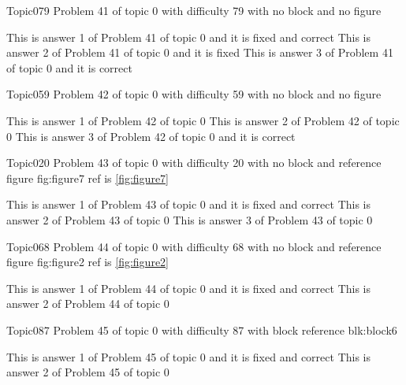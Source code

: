 \documentclass[master]{exam}
\begin{document}
\begin{problem}{Topic0}{79}
	Problem 41 of topic 0 with difficulty 79 with no block and no figure
	\begin{answers}
		 This is answer 1 of Problem 41 of topic 0 and it is fixed and correct
		\answer[fixed] This is answer 2 of Problem 41 of topic 0 and it is fixed
		\answer[correct] This is answer 3 of Problem 41 of topic 0 and it is correct
	\end{answers}
\end{problem}

\begin{problem}{Topic0}{59}
	Problem 42 of topic 0 with difficulty 59 with no block and no figure
	\begin{answers}
		\answer This is answer 1 of Problem 42 of topic 0 
		\answer This is answer 2 of Problem 42 of topic 0 
		\answer[correct] This is answer 3 of Problem 42 of topic 0 and it is correct
	\end{answers}
\end{problem}

\begin{problem}{Topic0}{20}
	Problem 43 of topic 0 with difficulty 20 with no block and reference figure fig:figure7 ref is \ref{fig:figure7}
	\begin{answers}
		 This is answer 1 of Problem 43 of topic 0 and it is fixed and correct
		\answer This is answer 2 of Problem 43 of topic 0 
		\answer This is answer 3 of Problem 43 of topic 0 
	\end{answers}
\end{problem}

\begin{problem}{Topic0}{68}
	Problem 44 of topic 0 with difficulty 68 with no block and reference figure fig:figure2 ref is \ref{fig:figure2}
	\begin{answers}
		 This is answer 1 of Problem 44 of topic 0 and it is fixed and correct
		\answer This is answer 2 of Problem 44 of topic 0 
	\end{answers}
\end{problem}

\begin{problem}[requires=blk:block6]{Topic0}{87}
	Problem 45 of topic 0 with difficulty 87 with block reference blk:block6
	\begin{answers}
		 This is answer 1 of Problem 45 of topic 0 and it is fixed and correct
		\answer This is answer 2 of Problem 45 of topic 0 
	\end{answers}
\end{problem}
\end{document}
